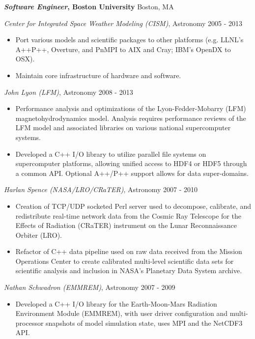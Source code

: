 \documentclass[line,margin]{res}
\begin{document}
\begin{resume}
          \newpage

          {\bf \emph{Software Engineer}, Boston University} \hfill Boston, MA

          {\sl Center for Integrated Space Weather Modeling (CISM)}, Astronomy \hfill 2005 - 2013
          \begin{itemize} \itemsep -2pt %
          \item
            Port various models and scientific packages to other platforms (e.g. LLNL's A++P++, Overture, and PnMPI to AIX and Cray; IBM's OpenDX to OSX).
          \item
            Maintain core infrastructure of hardware and software.
          \end{itemize}

          {\sl John Lyon (LFM)}, Astronomy \hfill 2008 - 2013
          \begin{itemize} \itemsep -2pt %
          \item
            Performance analysis and optimizations of the Lyon-Fedder-Mobarry (LFM) magnetohydrodynamics model.  Analysis requires performance reviews of the LFM model and associated libraries on various national supercomputer systems.
          \item
            Developed a C++ I/O library to utilize parallel file systems on supercomputer platforms, allowing unified access to HDF4 or HDF5 through a common API. Optional A++/P++ support allows for data super-domains.
          \end{itemize}

          {\sl Harlan Spence (NASA/LRO/CRaTER)}, Astronomy \hfill 2007 - 2010
          \begin{itemize} \itemsep -2pt
          \item
            Creation of TCP/UDP socketed Perl server used to decompose, calibrate, and redistribute real-time network data from the Cosmic Ray Telescope for the Effects of Radiation (CRaTER) instrument on the Lunar Reconnaissance Orbiter (LRO).
          \item
            Refactor of C++ data pipeline used on raw data received from the Mission Operations Center to create calibrated multi-level scientific data sets for scientific analysis and inclusion in NASA's Planetary Data System archive.
          \end{itemize}

          {\sl Nathan Schwadron (EMMREM)}, Astronomy \hfill 2007 - 2009
          \begin{itemize} \itemsep -2pt
          \item
            Developed a C++ I/O library for the Earth-Moon-Mars Radiation Environment Module (EMMREM), with user driver configuration and multi-processor snapshots of model simulation state, uses MPI and the NetCDF3 API.
          \end{itemize}


\end{resume}
\end{document}
